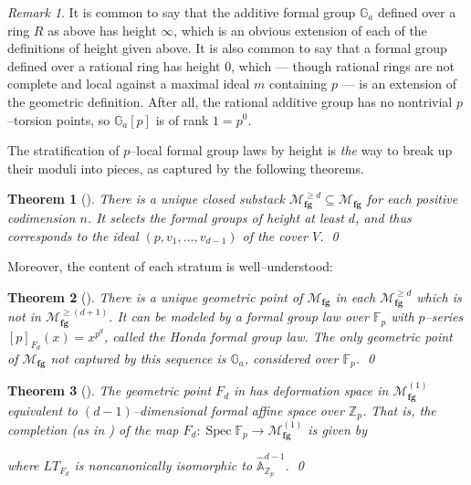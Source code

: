 \documentclass{amsart}
\newcommand{\Z}{\mathbb Z}
\newcommand{\F}{\mathbb F}
\newcommand{\G}{\mathbb G}
\newcommand{\A}{\widehat{\mathbb{A}}}
\newcommand{\m}{m}
\newcommand{\<}{\langle}
\renewcommand{\>}{\rangle}
\newcommand{\moduli}[1]{\mathcal{M}_{\mathbf{#1}}}
\DeclareMathOperator{\Spec}{Spec}
\DeclareMathOperator{\Spf}{Spf}
\DeclareMathOperator{\Def}{Def}
\theoremstyle{plain}
\newtheorem*{theorem}{Theorem}
\theoremstyle{definition}
\theoremstyle{remark}
\newtheorem*{remark}{Remark}
\begin{document}
\begin{remark}\label{ExceptionalAdditiveGps}
It is common to say that the additive formal group $\G_a$ defined over a ring $R$ as above has height $\infty$, which is an obvious extension of each of the definitions of height given above.  It is also common to say that a formal group defined over a rational ring has height $0$, which --- though rational rings are not complete and local against a maximal ideal $\m$ containing $p$ --- is an extension of the geometric definition.  After all, the rational additive group has no nontrivial $p$--torsion points, so $\G_a[p]$ is of rank $1 = p^0$.
\end{remark}

The stratification of $p$--local formal group laws by height is \emph{the} way to break up their moduli into pieces, as captured by the following theorems.

\begin{theorem}[{\cite{LandweberIIT}}]\label{LandweberIdealsTheorem}
There is a \emph{unique} closed substack $\moduli{fg}^{\ge d} \subseteq \moduli{fg}$ for each positive codimension $n$.  It selects the formal groups of height at least $d$, and thus corresponds to the ideal $(p, v_1, \ldots, v_{d-1})$ of the cover $V$. \qed
\end{theorem}

\noindent Moreover, the content of each stratum is well--understood:

\begin{theorem}[{\cite[Th\'eor\`eme IV]{Lazard}}]\label{GeometricPointsOfMfg}
There is a unique geometric point of $\moduli{fg}$ in each $\moduli{fg}^{\ge d}$ which is not in $\moduli{fg}^{\ge(d+1)}$.  It can be modeled by a formal group law over $\F_p$ with $p$--series $[p]_{F_d}(x) = x^{p^d}$, called the Honda formal group law.  The only geometric point of $\moduli{fg}$ not captured by this sequence is $\G_a$, considered over $\F_p$. \qed
\end{theorem}

\begin{theorem}[{\cite[Proposition 1.1]{LubinTate}}]\label{LubinTate}
The geometric point $F_d$ in  has deformation space in $\moduli{fg}^{(1)}$ equivalent to $(d-1)$--dimensional formal affine space over $\Z_p$.  That is, the completion (as in ) of the map $F_d: \Spec \F_p \to \moduli{fg}^{(1)}$ is given by
\begin{center}
\end{center}
where $LT_{F_d}$ is noncanonically isomorphic to $\A^{d-1}_{\Z_p}$. \qed
\end{theorem}
\end{document}
